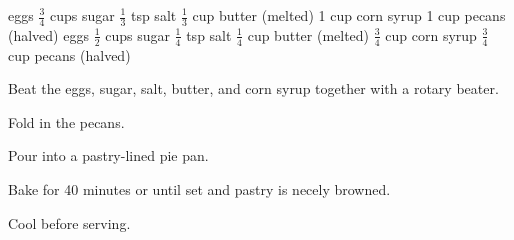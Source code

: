 \dishtype{}
\begin{ingreds}
     eggs
        $\frac{3}{4}$ cups sugar
        $\frac{1}{3}$ tsp salt
        $\frac{1}{3}$ cup butter (melted)
        1 cup corn syrup
        1 cup pecans (halved)
     eggs
        $\frac{1}{2}$ cups sugar
        $\frac{1}{4}$ tsp salt
        $\frac{1}{4}$ cup butter (melted)
        $\frac{3}{4}$ cup corn syrup
        $\frac{3}{4}$ cup pecans (halved)
\end{ingreds}
\begin{method}
    Beat the eggs, sugar, salt, butter, and corn syrup together with a rotary beater.\par
    Fold in the pecans.\par
    Pour into a pastry-lined pie pan.\par
    Bake for 40 minutes or until set and pastry is necely browned.\par
    Cool before serving.     
\end{method}